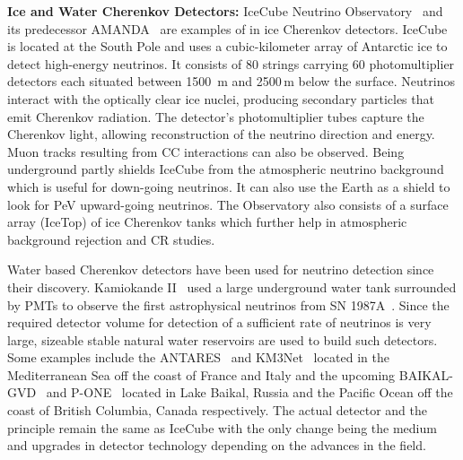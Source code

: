 \begin{description}
  \item \textbf{Ice and Water Cherenkov Detectors:} IceCube Neutrino Observatory~\cite{Aartsen_2017} and its predecessor AMANDA~\cite{WISCHNEWSKI1999412} are examples of in ice Cherenkov detectors. IceCube is located at the South Pole and uses a cubic-kilometer array of Antarctic ice to detect high-energy neutrinos. It consists of 80 strings carrying 60 photomultiplier detectors each situated between 1500 m and 2500\,m below the surface. Neutrinos interact with the optically clear ice nuclei, producing secondary particles that emit Cherenkov radiation. The detector's photomultiplier tubes capture the Cherenkov light, allowing reconstruction of the neutrino direction and energy. Muon tracks resulting from CC interactions can also be observed. Being underground partly shields IceCube from the atmospheric neutrino background which is useful for down-going neutrinos. It can also use the Earth as a shield to look for PeV upward-going neutrinos. The Observatory also consists of a surface array (IceTop) of ice Cherenkov tanks which further help in atmospheric background rejection and CR studies. 
  
  Water based Cherenkov detectors have been used for neutrino detection since their discovery. Kamiokande II~\cite{Arisaka:1984aoa} used a large underground water tank surrounded by PMTs to observe the first astrophysical neutrinos from SN 1987A~\cite{PhysRevLett.58.1490}. Since the required detector volume for detection of a sufficient rate of neutrinos is very large, sizeable stable natural water reservoirs are used to build such detectors. Some examples include the ANTARES~\cite{CREUSOT2013489} and KM3Net~\cite{MARGIOTTA201483} located in the Mediterranean Sea off the coast of France and Italy and the upcoming BAIKAL-GVD~\cite{MALYSHKIN2023168117} and P-ONE~\cite{P-ONE:2020ljt} located in Lake Baikal, Russia and the Pacific Ocean off the coast of British Columbia, Canada respectively. The actual detector and the principle remain the same as IceCube with the only change being the medium and upgrades in detector technology depending on the advances in the field. 
  

\end{description}
